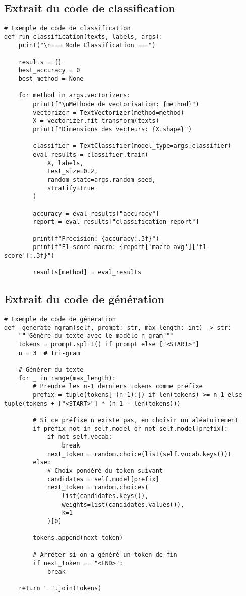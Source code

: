 \documentclass[a4paper,11pt]{article}
\begin{document}
\subsection{Extrait du code de classification}
\begin{lstlisting}[caption=Classification des paroles]
# Exemple de code de classification
def run_classification(texts, labels, args):
    print("\n=== Mode Classification ===")
    
    results = {}
    best_accuracy = 0
    best_method = None
    
    for method in args.vectorizers:
        print(f"\nMéthode de vectorisation: {method}")
        vectorizer = TextVectorizer(method=method)
        X = vectorizer.fit_transform(texts)
        print(f"Dimensions des vecteurs: {X.shape}")
        
        classifier = TextClassifier(model_type=args.classifier)
        eval_results = classifier.train(
            X, labels, 
            test_size=0.2, 
            random_state=args.random_seed, 
            stratify=True
        )
        
        accuracy = eval_results["accuracy"]
        report = eval_results["classification_report"]
        
        print(f"Précision: {accuracy:.3f}")
        print(f"F1-score macro: {report['macro avg']['f1-score']:.3f}")
        
        results[method] = eval_results
\end{lstlisting}

\subsection{Extrait du code de génération}
\begin{lstlisting}[caption=Génération de paroles]
# Exemple de code de génération
def _generate_ngram(self, prompt: str, max_length: int) -> str:
    """Génère du texte avec le modèle n-gram"""
    tokens = prompt.split() if prompt else ["<START>"]
    n = 3  # Tri-gram

    # Générer du texte
    for _ in range(max_length):
        # Prendre les n-1 derniers tokens comme préfixe
        prefix = tuple(tokens[-(n-1):]) if len(tokens) >= n-1 else tuple(tokens + ["<START>"] * (n-1 - len(tokens)))
        
        # Si ce préfixe n'existe pas, en choisir un aléatoirement
        if prefix not in self.model or not self.model[prefix]:
            if not self.vocab:
                break
            next_token = random.choice(list(self.vocab.keys()))
        else:
            # Choix pondéré du token suivant
            candidates = self.model[prefix]
            next_token = random.choices(
                list(candidates.keys()),
                weights=list(candidates.values()),
                k=1
            )[0]
        
        tokens.append(next_token)
        
        # Arrêter si on a généré un token de fin
        if next_token == "<END>":
            break
            
    return " ".join(tokens)
\end{lstlisting}
\end{document}
